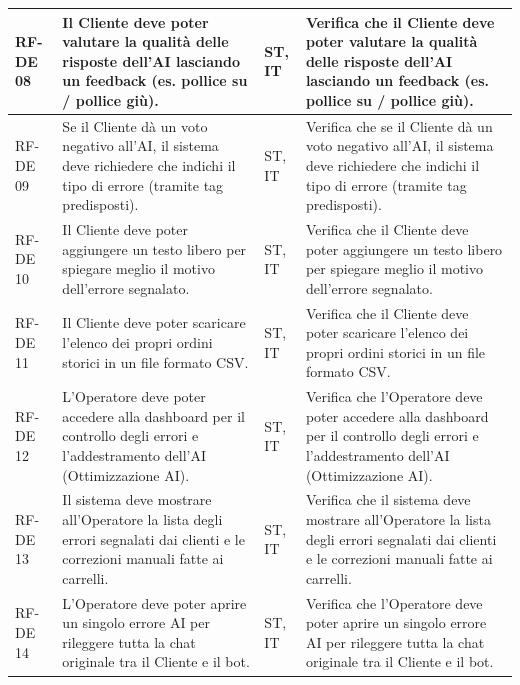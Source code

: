 \documentclass[a4paper,11pt,oneside]{scrartcl}
\begin{document}
\begin{longtable}{|p{1.5cm}|p{5.5cm}|p{1.8cm}|p{5cm}|}
    RF-DE 08         & Il Cliente deve poter valutare la qualità delle risposte dell'AI lasciando un feedback (es. pollice su / pollice giù).                  & ST, IT             & Verifica che il Cliente deve poter valutare la qualità delle risposte dell'AI lasciando un feedback (es. pollice su / pollice giù).                  \\ \hline
    RF-DE 09         & Se il Cliente dà un voto negativo all'AI, il sistema deve richiedere che indichi il tipo di errore (tramite tag predisposti).           & ST, IT             & Verifica che se il Cliente dà un voto negativo all'AI, il sistema deve richiedere che indichi il tipo di errore (tramite tag predisposti).           \\ \hline
    RF-DE 10         & Il Cliente deve poter aggiungere un testo libero per spiegare meglio il motivo dell'errore segnalato.                                   & ST, IT             & Verifica che il Cliente deve poter aggiungere un testo libero per spiegare meglio il motivo dell'errore segnalato.                                   \\ \hline
    RF-DE 11         & Il Cliente deve poter scaricare l'elenco dei propri ordini storici in un file formato CSV.                                              & ST, IT             & Verifica che il Cliente deve poter scaricare l'elenco dei propri ordini storici in un file formato CSV.                                              \\ \hline
    RF-DE 12         & L'Operatore deve poter accedere alla dashboard per il controllo degli errori e l'addestramento dell'AI (Ottimizzazione AI).             & ST, IT             & Verifica che l'Operatore deve poter accedere alla dashboard per il controllo degli errori e l'addestramento dell'AI (Ottimizzazione AI).             \\ \hline
    RF-DE 13         & Il sistema deve mostrare all'Operatore la lista degli errori segnalati dai clienti e le correzioni manuali fatte ai carrelli.           & ST, IT             & Verifica che il sistema deve mostrare all'Operatore la lista degli errori segnalati dai clienti e le correzioni manuali fatte ai carrelli.           \\ \hline
    RF-DE 14         & L'Operatore deve poter aprire un singolo errore AI per rileggere tutta la chat originale tra il Cliente e il bot.                       & ST, IT             & Verifica che l'Operatore deve poter aprire un singolo errore AI per rileggere tutta la chat originale tra il Cliente e il bot.                       \\ \hline

\end{longtable}
\end{document}
